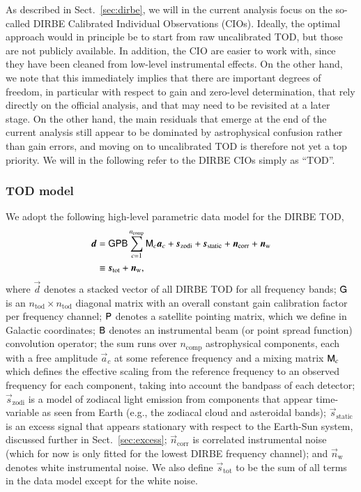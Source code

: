 \documentclass{aa}
\newcommand{\dv}[0]{\vec{d}}
\newcommand{\B}[0]{\tens{B}}
\renewcommand{\G}[0]{\tens{G}}
\newcommand{\n}[0]{\vec{n}}
\newcommand{\s}[0]{\vec{s}}
\renewcommand{\a}[0]{\vec{a}}
\newcommand{\M}[0]{\tens{M}}
\renewcommand{\P}[0]{\tens{P}}
\begin{document}
As described in Sect.~\ref{sec:dirbe}, we will in the current analysis
focus on the so-called DIRBE Calibrated Individual Observations
(CIOs). Ideally, the optimal approach would in principle be to start from raw uncalibrated TOD, but those are not
publicly available. In addition, the CIO are easier to work with,
since they have been cleaned from low-level instrumental effects. On
the other hand, we note that this immediately implies that there are
important degrees of freedom, in particular with respect to gain and
zero-level determination, that rely directly on the official analysis,
and that may need to be revisited at a later stage. On the other hand,
the main residuals that emerge at the end of the current analysis
still appear to be dominated by astrophysical confusion rather than
gain errors, and moving on to uncalibrated TOD is therefore not yet a
top priority. We will in the following refer to the DIRBE CIOs simply
as ``TOD''.

\subsubsection{TOD model}

We adopt the following high-level parametric data model for the DIRBE
TOD,
\begin{align}
	\label{eq:model}
	\dv &=\G\P\B\sum_{c=1}^{n_{\mathrm{comp}}}\M_c\a_c+\s_{\mathrm{zodi}} +
          \s_{\mathrm{static}} + \n_\mathrm{corr} + \n_\mathrm w\\
        &\equiv \s_{\mathrm{tot}} + \n_{\mathrm{w}},
\end{align}
where $\dv$ denotes a stacked vector of all DIRBE TOD for all
frequency bands; $\G$ is an $n_{\mathrm{tod}}\times
n_{\mathrm{tod}}$ diagonal matrix with an overall constant gain
calibration factor per frequency channel; $\P$ denotes a satellite
pointing matrix, which we define in Galactic coordinates; $\B$ denotes
an instrumental beam (or point spread function) convolution operator;
the sum runs over $n_{\mathrm{comp}}$ astrophysical components, each
with a free amplitude $\a_c$ at some reference frequency and a mixing
matrix $\M_c$ which defines the effective scaling from the reference
frequency to an observed frequency for each component, taking into account the
bandpass of each detector; $\s_{\mathrm{zodi}}$ is a model of zodiacal
light emission from components that appear time-variable as seen from
Earth (e.g., the zodiacal cloud and asteroidal bands);
$\s_{\mathrm{static}}$ is an excess signal that appears stationary
with respect to the Earth-Sun system, discussed further in Sect.~\ref{sec:excess}; $\n_{\mathrm{corr}}$ is 
correlated instrumental noise (which for now is only fitted for the
lowest DIRBE frequency channel); and $\n_{\mathrm{w}}$ denotes white
instrumental noise. We also define $\s_{\mathrm{tot}}$ to be the sum
of all terms in the data model except for the white noise.
\end{document}
